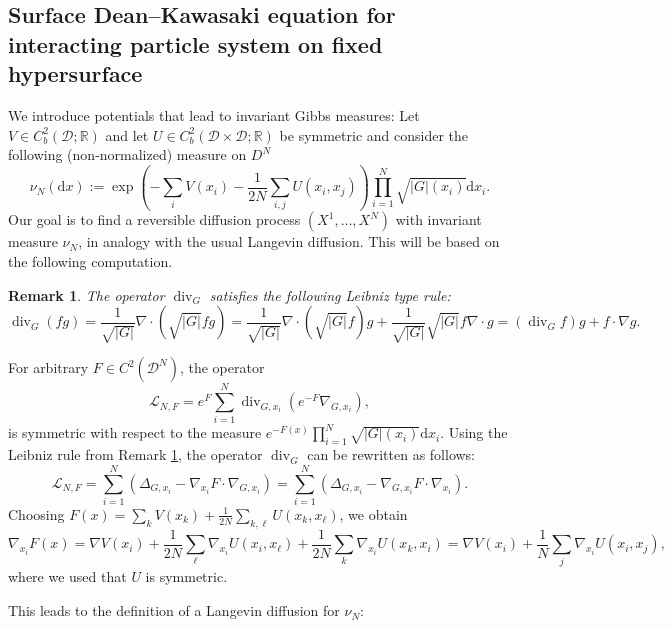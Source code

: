 \documentclass[11pt, a4paper]{article}
\newcommand{\cdummy}{\cdot}
\newcommand{\mathd}{\mathrm{d}}
\newtheorem{remark}[theorem]{Remark}%
\begin{document}
\subsection{Surface Dean--Kawasaki equation for interacting particle system on fixed hypersurface}


We introduce potentials that lead to invariant Gibbs measures: Let $V \in
C^2_b (\mathcal{D} ; \mathbb{R})$ and let $U \in C^2_b (\mathcal{D} \times \mathcal{D} ; \mathbb{R})$ be
symmetric and consider the following (non-normalized) measure on $D^N$
\[ \nu_N (\mathd x) := \exp \left( - \sum_i V (x_i) - \frac{1}{2 N} \sum_{i,
   j} U (x_i, x_j) \right) \prod_{i = 1}^N \sqrt{| G | (x_i)} \mathd x_i . \]
Our goal is to find a reversible diffusion process $(X^1, \ldots, X^N)$ with invariant measure $\nu_N$, in analogy with the usual Langevin diffusion. This
will be based on the following computation.

\begin{remark}\label{rem:LR}
  The operator $\operatorname{div}_G$ satisfies the following Leibniz type rule:
  \[ \operatorname{div}_G (f g) = \frac{1}{\sqrt{| G |}} \nabla \cdummy \left(
     \sqrt{| G |} f g \right) = \frac{1}{\sqrt{| G |}} \nabla \cdummy \left(
     \sqrt{| G |} f \right) g + \frac{1}{\sqrt{| G |}} \sqrt{| G |} f \nabla
     \cdummy g = (\operatorname{div}_G f) g + f \cdummy \nabla g. \]
\end{remark}
  For arbitrary  $F \in C^2 (\mathcal{D}^N)$, the operator 
  \[
  \mathcal{L}_{N, F} = e^F \sum_{i = 1}^N \operatorname{div}_{G, x_i} (e^{- F} \nabla_{G, x_i}) , 
  \]
 is  symmetric with respect to the measure $e^{- F (x)} \prod_{i =
  1}^N \sqrt{| G | (x_i)} \mathd x_i$. 
  Using the Leibniz rule from Remark \ref{rem:LR}, the operator $\operatorname{div}_{G}$ can be rewritten as follows:
  \[ \mathcal{L}_{N, F}  = \sum_{i = 1}^N (\Delta_{G, x_i} - \nabla_{x_i} F
     \cdummy \nabla_{G, x_i}) = \sum_{i = 1}^N (\Delta_{G, x_i} - \nabla_{G,
     x_i} F \cdummy \nabla_{x_i}) . \]
  Choosing $F (x) = \sum_k V (x_k) + \frac{1}{2 N} \sum_{k, \ell} U (x_k,
  x_{\ell})$, we obtain
  \[ \nabla_{x_i} F (x) = \nabla V (x_i) + \frac{1}{2 N} \sum_{\ell}
     \nabla_{x_i} U (x_i, x_{\ell}) + \frac{1}{2 N} \sum_k \nabla_{x_i} U
     (x_k, x_i) = \nabla V (x_i) + \frac{1}{N} \sum_j \nabla_{x_i} U (x_i,
     x_j), \]
  where we used that $U$ is symmetric.


This leads to the definition of a Langevin diffusion for $\nu_N$:
\end{document}
